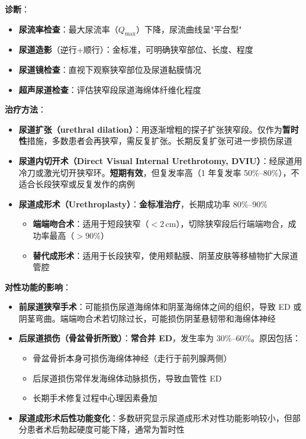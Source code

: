 \vspace{0.5em}
\noindent\textbf{诊断}：
\begin{itemize}[leftmargin=2cm]
	\item \textbf{尿流率检查}：最大尿流率（$Q_{\max}$）下降，尿流曲线呈"平台型"
	\item \textbf{尿道造影}（逆行+顺行）：金标准，可明确狭窄部位、长度、程度
	\item \textbf{尿道镜检查}：直视下观察狭窄部位及尿道黏膜情况
	\item \textbf{超声尿道检查}：评估狭窄段尿道海绵体纤维化程度
\end{itemize}

\vspace{0.5em}
\noindent\textbf{治疗方法}：

\begin{itemize}[leftmargin=2cm]
	\item \textbf{尿道扩张（urethral dilation）}：用逐渐增粗的探子扩张狭窄段。仅作为\textbf{暂时性}措施，多数患者会再狭窄，需反复扩张。长期反复扩张可进一步损伤尿道
	\item \textbf{尿道内切开术（Direct Visual Internal Urethrotomy, DVIU）}：经尿道用冷刀或激光切开狭窄环。\textbf{短期有效}，但复发率高（1 年复发率 50\%--80\%），不适合长段狭窄或反复发作的病例
	\item \textbf{尿道成形术（Urethroplasty）}：\textbf{金标准治疗}，长期成功率 80\%--90\%
	\begin{itemize}
		\item \textbf{端端吻合术}：适用于短段狭窄（$<2\,$cm），切除狭窄段后行端端吻合，成功率最高（$>90\%$）
		\item \textbf{替代成形术}：适用于长段狭窄，使用颊黏膜、阴茎皮肤等移植物扩大尿道管腔
	\end{itemize}
\end{itemize}

\vspace{0.5em}
\noindent\textbf{对性功能的影响}：

\begin{itemize}[leftmargin=2cm]
	\item \textbf{前尿道狭窄手术}：可能损伤尿道海绵体和阴茎海绵体之间的组织，导致 ED 或阴茎弯曲。端端吻合术若切除过长，可能损伤阴茎悬韧带和海绵体神经
	\item \textbf{后尿道损伤（骨盆骨折所致）}：\textbf{常合并 ED}，发生率为 30\%--60\%。原因包括：
	\begin{itemize}
		\item 骨盆骨折本身可损伤海绵体神经（走行于前列腺两侧）
		\item 后尿道损伤常伴发海绵体动脉损伤，导致血管性 ED
		\item 长期手术修复过程中心理因素叠加
	\end{itemize}
	\item \textbf{尿道成形术后性功能变化}：多数研究显示尿道成形术对性功能影响较小，但部分患者术后勃起硬度可能下降，通常为暂时性
\end{itemize}

